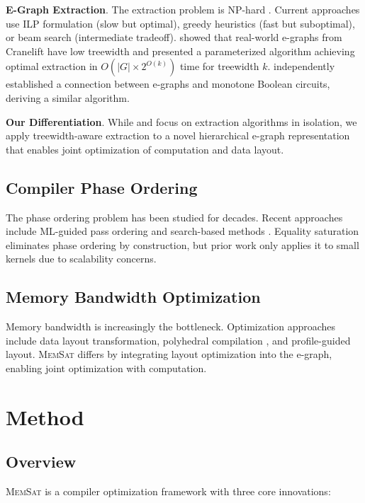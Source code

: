 \documentclass[11pt]{article}
\newcommand{\memsat}{\textsc{MemSat}}
\begin{document}
\textbf{E-Graph Extraction}. The extraction problem is NP-hard \citep{zhang2023np}. Current approaches use ILP formulation (slow but optimal), greedy heuristics (fast but suboptimal), or beam search (intermediate tradeoff). \citet{goharshady2024fast} showed that real-world e-graphs from Cranelift have low treewidth and presented a parameterized algorithm achieving optimal extraction in $O(|G| \times 2^{O(k)})$ time for treewidth $k$. \citet{sun2024egraphs} independently established a connection between e-graphs and monotone Boolean circuits, deriving a similar algorithm.

\textbf{Our Differentiation}. While \citet{goharshady2024fast} and \citet{sun2024egraphs} focus on extraction algorithms in isolation, we apply treewidth-aware extraction to a novel hierarchical e-graph representation that enables joint optimization of computation and data layout.

\subsection{Compiler Phase Ordering}

The phase ordering problem has been studied for decades. Recent approaches include ML-guided pass ordering \citep{hajali2020autophase} and search-based methods \citep{wang2024solving}. Equality saturation eliminates phase ordering by construction, but prior work only applies it to small kernels due to scalability concerns.

\subsection{Memory Bandwidth Optimization}

Memory bandwidth is increasingly the bottleneck. Optimization approaches include data layout transformation, polyhedral compilation \citep{bondhugula2008pluto}, and profile-guided layout. \memsat{} differs by integrating layout optimization into the e-graph, enabling joint optimization with computation.

\section{Method}
\label{sec:method}

\subsection{Overview}

\memsat{} is a compiler optimization framework with three core innovations:
\end{document}
